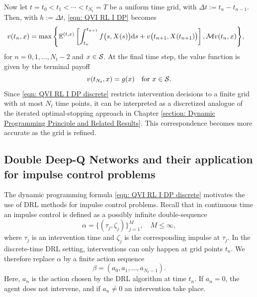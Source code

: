 Now let $t=t_0 < t_1 < \cdots < t_{N_{t}} = T$ be a uniform time grid, with $\Delta t := t_n - t_{n-1}$. Then, with $h:=\Delta t$, \eqref{eqn: QVI RL I DP} becomes
\begin{align}
    v(t_n,x) = \max \Bigg\{ \mathbb{E}^{(t,x)} & \left[ \int_{t_n}^{t_{n+1}} f\big(s,X(s)\big) \mathrm{d} s + v\big(t_{n+1},X(t_{n+1}) \big) \right], \mathcal{M} v(t_n,x) \Bigg\}, \label{eqn: QVI RL I DP discrete}
\end{align}
for $n=0,1,\ldots,N_t-2$ and $x \in \mathcal{S}$. At the final time step, the value function is given by the terminal payoff
\begin{equation*}
    v(t_{N_t}, x) = g(x) \quad \text{for } x \in \mathcal{S}.
\end{equation*}
Since \eqref{eqn: QVI RL I DP discrete} restricts intervention decisions to a finite grid with at most $N_t$ time points, it can be interpreted as a discretized analogue of the iterated optimal-stopping approach in Chapter \ref{section: Dynamic Programming Principle and Related Results}. This correspondence becomes more accurate as the grid is refined. 

\subsection{Double Deep-Q Networks and their application for impulse control problems}
\label{section: Double Deep-Q Networks and their application to impulse control problems}
The dynamic programming formula \eqref{eqn: QVI RL I DP discrete} motivates the use of DRL methods for impulse control problems. Recall that in continuous time an impulse control is defined as a possibly infinite double-sequence
\begin{equation*}
    \alpha = \{(\tau_j, \zeta_j)\}_{j=1}^M, \quad M \leq \infty,
\end{equation*}
where $\tau_j$ is an intervention time and $\zeta_j$ is the corresponding impulse at $\tau_j$. In the discrete-time DRL setting, interventions can only happen at grid points $t_n$. We therefore replace $\alpha$ by a finite action sequence 
\begin{equation*}
    \beta = (a_0, a_1, \ldots, a_{N_{t}-1}).
\end{equation*}
Here, $a_n$ is the action chosen by the DRL algorithm at time $t_n$. If $a_n = 0$, the agent does not intervene, and if $a_n\neq 0$ an intervention take place. 

